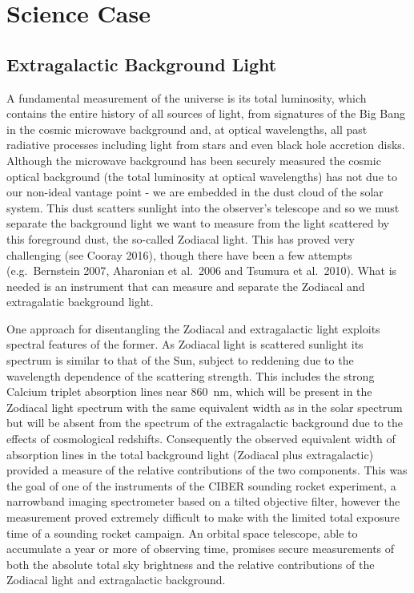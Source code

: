 \documentclass[]{iac}
\begin{document}
\section{Science Case}
\label{sec:aims}

\subsection{Extragalactic Background Light}

A fundamental measurement of the universe is its total luminosity, which contains the entire history of all sources of
light, from signatures of the Big Bang in the cosmic microwave background and, at optical wavelengths, all past
radiative processes including light from stars and even black hole accretion disks. Although the microwave background
has been securely measured the cosmic optical background (the total luminosity at optical wavelengths) has not due to
our non-ideal vantage point - we are embedded in the dust cloud of the solar system. This dust scatters sunlight into
the observer's telescope and so we must separate the background light we want to measure from the light scattered by
this foreground dust, the so-called Zodiacal light. This has proved very challenging (see Cooray 2016\cite{Cooray2016}),
though there have been a few attempts (e.g.\ Bernstein 2007\cite{Bernstein2007}, Aharonian et al.\
2006\cite{Aharonian2006} and Tsumura et al.\ 2010\cite{Tsumura2010}). What is needed is an instrument that can measure
and separate the Zodiacal and extragalatic background light.

One approach for disentangling the Zodiacal and extragalactic light exploits spectral features of the former. As
Zodiacal light is scattered sunlight its spectrum is similar to that of the Sun, subject to reddening due to the
wavelength dependence of the scattering strength\cite{Giavalisco2002,Aldering2001,Leinert1998}. This includes the strong
Calcium triplet absorption lines near \SI{860}{\nano\metre}, which will be present in the Zodiacal light spectrum with
the same equivalent width as in the solar spectrum but will be absent from the spectrum of the extragalactic background
due to the effects of cosmological redshifts. Consequently the observed equivalent width of absorption lines in the
total background light (Zodiacal plus extragalactic) provided a measure of the relative contributions of the two
components. This was the goal of one of the instruments of the CIBER sounding rocket experiment\cite{Zemcov2013}, a
narrowband imaging spectrometer based on a tilted objective filter\cite{Korngut2013}, however the measurement proved
extremely difficult to make with the limited total exposure time of a sounding rocket campaign. An orbital space
telescope, able to accumulate a year or more of observing time, promises secure measurements of both the absolute total
sky brightness and the relative contributions of the Zodiacal light and extragalactic background.
\end{document}
